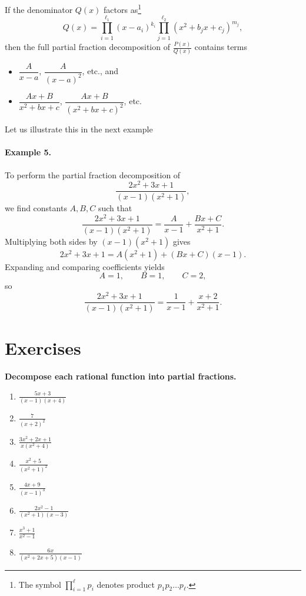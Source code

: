If the denominator $Q(x)$ factors as\footnote[1]{The symbol $\prod_{i=1}^\ell p_i$ denotes product $p_1p_2 \dots p_\ell$.}
\[
Q(x)=
\prod_{i=1}^{\ell_1} (x-a_i)^{k_i}
\prod_{j=1}^{\ell_2} (x^2 + b_jx + c_j)^{m_j},
\] 
then the full partial fraction decomposition of \(\displaystyle\frac{P(x)}{Q(x)}\) contains terms

\begin{itemize}
	\item    $ \dfrac{A}{x-a}$, 
	$\dfrac{A}{(x-a)^2}$, etc., and
	\item  $ \dfrac{Ax+B}{x^2+bx+c}$,
	$\dfrac{Ax+B}{(x^2+bx+c)^2}$, etc.
\end{itemize}
Let us illustrate this in the next example

\paragraph{Example 5.} To perform the partial fraction decomposition of 
\[
\frac{2x^2+3x+1}{(x-1)(x^2+1)},
\]
we find constants $A, B, C$ such that 
\[\frac{2x^2+3x+1}{(x-1)(x^2+1)}= \frac{A}{x-1} + \frac{Bx+C}{x^2+1}.\]
Multiplying both sides by $(x-1)(x^2+1)$ gives
\[
2x^2+3x+1 = A(x^2+1) + (Bx+C)(x-1).
\]
Expanding and comparing coefficients yields
\[
A = 1,\qquad B = 1,\qquad C = 2,
\]
so
\[
\frac{2x^2+3x+1}{(x-1)(x^2+1)}
= \frac{1}{x-1} + \frac{x+2}{x^2+1}.
\]

\bigskip



\section*{Exercises}

\resetitems
\textbf{Decompose each rational function into partial fractions.}

\begin{enumerate}
	\item $\displaystyle \frac{5x+3}{(x-1)(x+4)}$
	\item $\displaystyle \frac{7}{(x+2)^2}$
	\item $\displaystyle \frac{3x^2+2x+1}{x(x^2+4)}$
	\item $\displaystyle \frac{x^2+5}{(x^2+1)^2}$
	\item $\displaystyle \frac{4x+9}{(x-1)^3}$
	\item $\displaystyle \frac{2x^2-1}{(x^2+1)(x-3)}$
	\item $\displaystyle \frac{x^3+1}{x^2-1}$
	\item $\displaystyle \frac{6x}{(x^2+2x+5)(x-1)}$
\end{enumerate}

